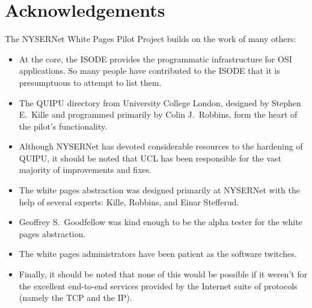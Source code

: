 \newpage
\section	{Acknowledgements}
The NYSERNet White Pages Pilot Project builds on the work of many others:
\begin{itemize}
\item	At the core,
	the ISODE provides the programmatic infrastructure for OSI
	applications.
	So many people have contributed to the ISODE that it is presumptuous
	to attempt to list them.

\item	The QUIPU directory from University College London,
	designed by Stephen E.~Kille and programmed primarily by
	Colin J.~Robbins, form the heart of the pilot's functionality.

\item	Although NYSERNet has devoted considerable resources to the hardening
	of QUIPU,
	it should be noted that UCL has been responsible for the vast majority
	of improvements and fixes.

\item	The white pages abstraction was designed primarily at NYSERNet with
	the help of several experts: Kille, Robbins, and Einar Stefferud.

\item	Geoffrey S.~Goodfellow was kind enough to be the alpha tester for the
	white pages abstraction.

\item	The white pages administrators have been patient as the software
	twitches.

\item	Finally,
	it should be noted that none of this would be possible if it
	weren't for the excellent end-to-end services provided by the Internet
	suite of protocols (namely the TCP and the IP).
\end{itemize}
